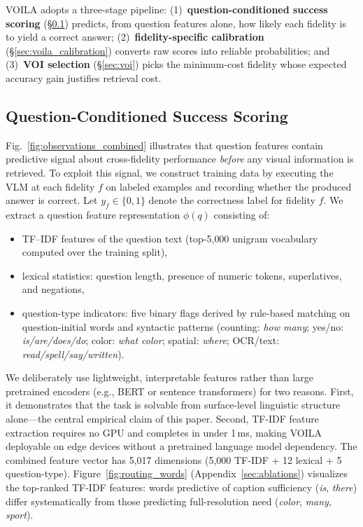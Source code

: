 VOILA adopts a three-stage pipeline: (1)~\textbf{question-conditioned success scoring} (\S\ref{sec:success_scoring}) predicts, from question features alone, how likely each fidelity is to yield a correct answer; (2)~\textbf{fidelity-specific calibration} (\S\ref{sec:voila_calibration}) converts raw scores into reliable probabilities; and (3)~\textbf{VOI selection} (\S\ref{sec:voi}) picks the minimum-cost fidelity whose expected accuracy gain justifies retrieval cost.


\subsection{Question-Conditioned Success Scoring}\label{sec:success_scoring}

Fig.~\ref{fig:observations_combined} illustrates that question features contain predictive signal about cross-fidelity performance \emph{before} any visual information is retrieved. To exploit this signal, we construct training data by executing the VLM at each fidelity $f$ on labeled examples and recording whether the produced answer is correct. Let $y_f \in \{0,1\}$ denote the correctness label for fidelity $f$. We extract a question feature representation $\phi(q)$ consisting of:
\begin{itemize}[nosep]
    \item TF--IDF features of the question text (top-5{,}000 unigram vocabulary computed over the training split),
    \item lexical statistics: question length, presence of numeric tokens, superlatives, and negations,
    \item question-type indicators: five binary flags derived by rule-based matching on question-initial words and syntactic patterns (counting: \emph{how many}; yes/no: \emph{is/are/does/do}; color: \emph{what color}; spatial: \emph{where}; OCR/text: \emph{read/spell/say/written}).
\end{itemize}

We deliberately use lightweight, interpretable features rather than large pretrained encoders (e.g., BERT or sentence transformers) for two reasons.
First, it demonstrates that the task is solvable from surface-level linguistic structure alone---the central empirical claim of this paper.
Second, TF-IDF feature extraction requires no GPU and completes in under 1\,ms, making \textsc{VOILA} deployable on edge devices without a pretrained language model dependency.
The combined feature vector has 5{,}017 dimensions (5{,}000 TF-IDF + 12 lexical + 5 question-type).
Figure~\ref{fig:routing_words} (Appendix~\ref{sec:ablations}) visualizes the top-ranked TF-IDF features: words predictive of caption sufficiency (\emph{is}, \emph{there}) differ systematically from those predicting full-resolution need (\emph{color}, \emph{many}, \emph{sport}).

